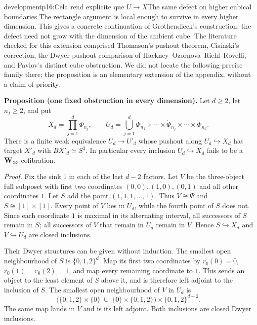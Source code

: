 \begin{dcomment}{development}{p16:Cela rend explicite que $U \longrightarrow X$}{The same defect on higher cubical boundaries}
The rectangle argument is local enough to survive in every higher dimension. This gives a concrete continuation of Grothendieck's construction: the defect need not grow with the dimension of the ambient cube. The literature checked for this extension comprised Thomason's pushout theorem, Cisinski's correction, the Dwyer pushout comparison of Hackney--Ozornova--Riehl--Rovelli, and Pavlov's distinct cube obstruction. We did not locate the following precise family there; the proposition is an elementary extension of the appendix, without a claim of priority.

\textbf{Proposition (one fixed obstruction in every dimension).}\ours
Let $d\geq2$, let $n_j\geq2$, and put
\[
 X_d=\prod_{j=1}^d\Phi_{n_j},\qquad
 U_d=\bigcup_{j=1}^d
   \Phi_{n_1}\times\cdots\times\dot\Phi_{n_j}\times\cdots\times\Phi_{n_d}.
\]
There is a finite weak equivalence $U_d\to U'_d$ whose pushout along $U_d\hookrightarrow X_d$ has target $X'_d$ with $BX'_d\simeq S^3$. In particular every inclusion $U_d\hookrightarrow X_d$ fails to be a $\mathbf{W}_{\infty}$-cofibration.

\emph{Proof.} Fix the sink $1$ in each of the last $d-2$ factors. Let $V$ be the three-object full subposet with first two coordinates $(0,0),(1,0),(0,1)$ and all other coordinates $1$. Let $S$ add the point $(1,1,1,\ldots,1)$. Thus $V\cong\Psi$ and $S\cong[1]\times[1]$. Every point of $V$ lies in $U_d$, while the fourth point of $S$ does not. Since each coordinate $1$ is maximal in its alternating interval, all successors of $S$ remain in $S$; all successors of $V$ that remain in $U_d$ remain in $V$. Hence $S\hookrightarrow X_d$ and $V\hookrightarrow U_d$ are closed inclusions.

Their Dwyer structures can be given without induction. The smallest open neighbourhood of $S$ is $\{0,1,2\}^d$. Map its first two coordinates by $r_0(0)=0$, $r_0(1)=r_0(2)=1$, and map every remaining coordinate to $1$. This sends an object to the least element of $S$ above it, and is therefore left adjoint to the inclusion of $S$. The smallest open neighbourhood of $V$ in $U_d$ is
\[
 \bigl(\{0,1,2\}\times\{0\}\;\cup\;
       \{0\}\times\{0,1,2\}\bigr)\times\{0,1,2\}^{d-2}.
\]
The same map lands in $V$ and is its left adjoint. Both inclusions are closed Dwyer inclusions.


\end{dcomment}
